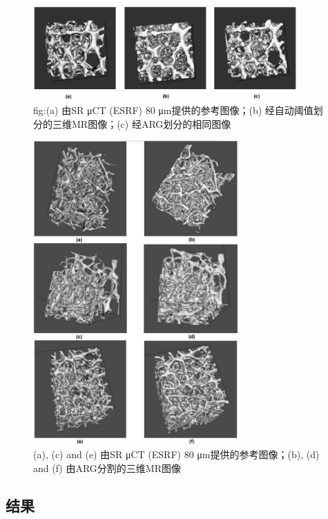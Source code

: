\begin{figure}[htbp]
    \centering
    \includegraphics[width=0.9\textwidth]{figures/划分横比.png}
    \caption{fig:(a) 由SR μCT (ESRF) 80 μm提供的参考图像；(b) 经自动阈值划分的三维MR图像；(c) 经ARG划分的相同图像}
    \label{fig:划分横比}
\end{figure}

\begin{figure}[htbp]
    \centering
    \includegraphics[width=0.7\textwidth]{figures/划分对比.png}
    \caption{(a), (c) and (e) 由SR μCT (ESRF) 80 μm提供的参考图像；(b), (d) and (f) 由ARG分割的三维MR图像}
    \label{fig:划分对比}
\end{figure}

\subsection{结果}

